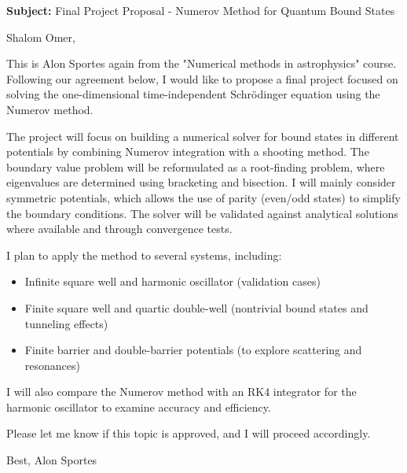 \documentclass[11pt]{article}
\begin{document}
\noindent
\textbf{Subject:} Final Project Proposal - Numerov Method for Quantum Bound States

\vspace{0.5cm}

Shalom Omer,

This is Alon Sportes again from the "Numerical methods in astrophysics" course. Following our agreement below, I would like to propose a final project focused on solving the one-dimensional time-independent Schrödinger equation using the Numerov method.

The project will focus on building a numerical solver for bound states in different potentials by combining Numerov integration with a shooting method. The boundary value problem will be reformulated as a root-finding problem, where eigenvalues are determined using bracketing and bisection. I will mainly consider symmetric potentials, which allows the use of parity (even/odd states) to simplify the boundary conditions. The solver will be validated against analytical solutions where available and through convergence tests.

I plan to apply the method to several systems, including:
\begin{itemize}
    \item Infinite square well and harmonic oscillator (validation cases)
    \item Finite square well and quartic double-well (nontrivial bound states and tunneling effects)
    \item Finite barrier and double-barrier potentials (to explore scattering and resonances)
\end{itemize}

I will also compare the Numerov method with an RK4 integrator for the harmonic oscillator to examine accuracy and efficiency.

Please let me know if this topic is approved, and I will proceed accordingly.

\vspace{0.5cm}

\noindent
Best,
Alon Sportes
\end{document}
